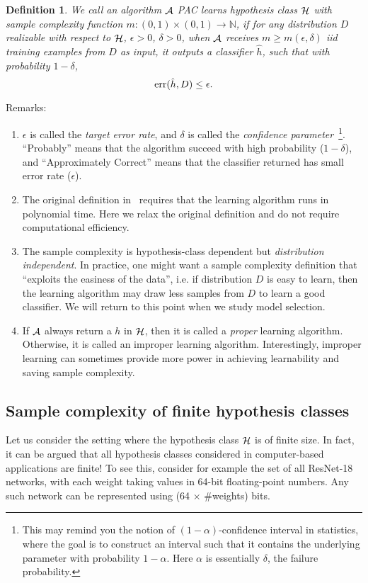 \documentclass{article}
\newtheorem{definition}{Definition}
\DeclareMathOperator*{\err}{{\rm err}}
\DeclareMathOperator*{\Hcal}{{\cal H}}
\DeclareMathOperator*{\Acal}{{\cal A}}
\newcommand{\NN}{\mathbb{N}}
\begin{document}
\begin{definition}
We call an algorithm $\Acal$ PAC learns hypothesis class $\Hcal$ with sample complexity
function $m: (0,1) \times (0,1) \to \NN$, if for any distribution $D$ realizable with respect to $\Hcal$, $\epsilon > 0$, $\delta > 0$,
when $\Acal$ receives $m \geq m(\epsilon, \delta)$ iid training examples from $D$ as input,
 it outputs
a classifier $\hat{h}$, such that with probability $1-\delta$,
\[ \err(\hat{h}, D) \leq \epsilon. \]
\end{definition}

Remarks:
\begin{enumerate}
\item $\epsilon$ is called the {\em target error rate}, and $\delta$ is called the {\em confidence parameter}~\footnote{This may remind you the notion of $(1-\alpha)$-confidence interval in statistics, where the goal is to construct an interval such that it contains the underlying parameter with probability $1-\alpha$. Here $\alpha$ is essentially $\delta$, the failure probability.}. ``Probably'' means that the algorithm succeed with high probability ($1-\delta$),
and ``Approximately Correct'' means that the classifier returned has small error rate ($\epsilon$).
\item The original definition in~\cite{valiant1984theory} requires that the learning algorithm runs in polynomial time. Here we relax the original definition and do not require computational efficiency.
\item The sample complexity is hypothesis-class dependent but {\em distribution independent}. In practice, one might want a sample complexity definition that ``exploits the easiness of the data'', i.e. if distribution $D$ is easy to learn, then the learning algorithm may draw less samples from $D$ to learn a good classifier. We will return to this point when we study model selection.
\item If $\Acal$ always return a $h$ in $\Hcal$, then it is called a {\em proper} learning algorithm. Otherwise, it is called an improper learning algorithm. Interestingly, improper learning can sometimes provide more power in achieving learnability and saving sample complexity.
\end{enumerate}

\subsection{Sample complexity of finite hypothesis classes}
Let us consider the setting where the hypothesis class $\Hcal$ is of finite size. In fact,
it can be argued that all hypothesis classes considered in computer-based applications are finite! To see this, consider for example the set of all ResNet-18 networks, with each weight taking values in 64-bit floating-point numbers. Any such network can be represented using (64 $\times$ \#weights) bits.
\end{document}

